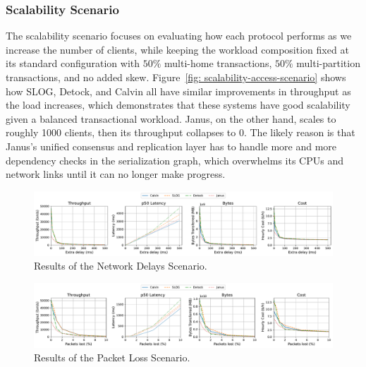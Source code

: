 \subsubsection{Scalability Scenario}
\label{subsubsec: scalability-scenario}
The scalability scenario focuses on evaluating how each protocol performs as we increase the number of clients, while keeping the workload composition fixed at its standard configuration with $50\%$ multi-home transactions, $50\%$ multi-partition transactions, and no added skew. Figure~\ref{fig: scalability-access-scenario} shows how SLOG, Detock, and Calvin all have similar improvements in throughput as the load increases, which demonstrates that these systems have good scalability given a balanced transactional workload. Janus, on the other hand, scales to roughly 1000 clients, then its throughput collapses to 0. The likely reason is that Janus's unified consensus and replication layer has to handle more and more dependency checks in the serialization graph, which overwhelms its CPUs and network links until it can no longer make progress.

\begin{figure}[t]
    \centering
    \includegraphics[width=1\textwidth]{figures/Network.pdf}
    \caption{Results of the Network Delays Scenario.}
    \label{fig: network-delays-scenario}
\end{figure}

\begin{figure}[t]
    \centering
    \includegraphics[width=1\textwidth]{figures/Packet Loss.pdf}
    \caption{Results of the Packet Loss Scenario.}
    \label{fig: packet-loss-scenario}
\end{figure}

